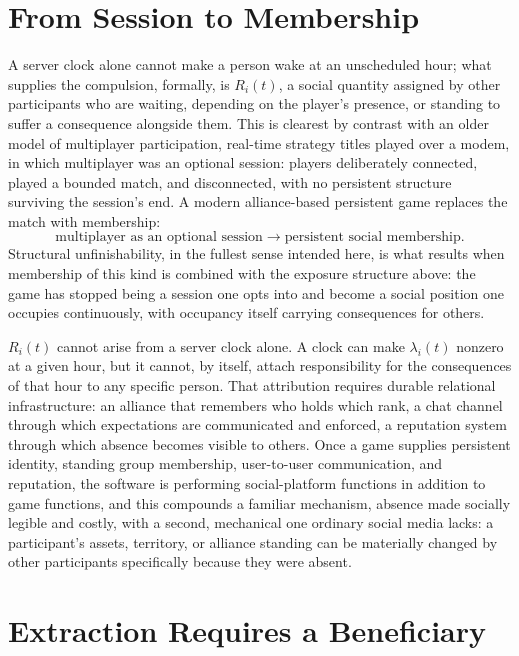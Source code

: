 \section{From Session to Membership}

A server clock alone cannot make a person wake at an unscheduled hour; what supplies the compulsion, formally, is $R_i(t)$, a social quantity assigned by other participants who are waiting, depending on the player's presence, or standing to suffer a consequence alongside them. This is clearest by contrast with an older model of multiplayer participation, real-time strategy titles played over a modem, in which multiplayer was an optional session: players deliberately connected, played a bounded match, and disconnected, with no persistent structure surviving the session's end. A modern alliance-based persistent game replaces the match with membership:
\[
\text{multiplayer as an optional session} \longrightarrow \text{persistent social membership}.
\]
Structural unfinishability, in the fullest sense intended here, is what results when membership of this kind is combined with the exposure structure above: the game has stopped being a session one opts into and become a social position one occupies continuously, with occupancy itself carrying consequences for others.

$R_i(t)$ cannot arise from a server clock alone. A clock can make $\lambda_i(t)$ nonzero at a given hour, but it cannot, by itself, attach responsibility for the consequences of that hour to any specific person. That attribution requires durable relational infrastructure: an alliance that remembers who holds which rank, a chat channel through which expectations are communicated and enforced, a reputation system through which absence becomes visible to others. Once a game supplies persistent identity, standing group membership, user-to-user communication, and reputation, the software is performing social-platform functions in addition to game functions, and this compounds a familiar mechanism, absence made socially legible and costly, with a second, mechanical one ordinary social media lacks: a participant's assets, territory, or alliance standing can be materially changed by other participants specifically because they were absent.

\section{Extraction Requires a Beneficiary}

